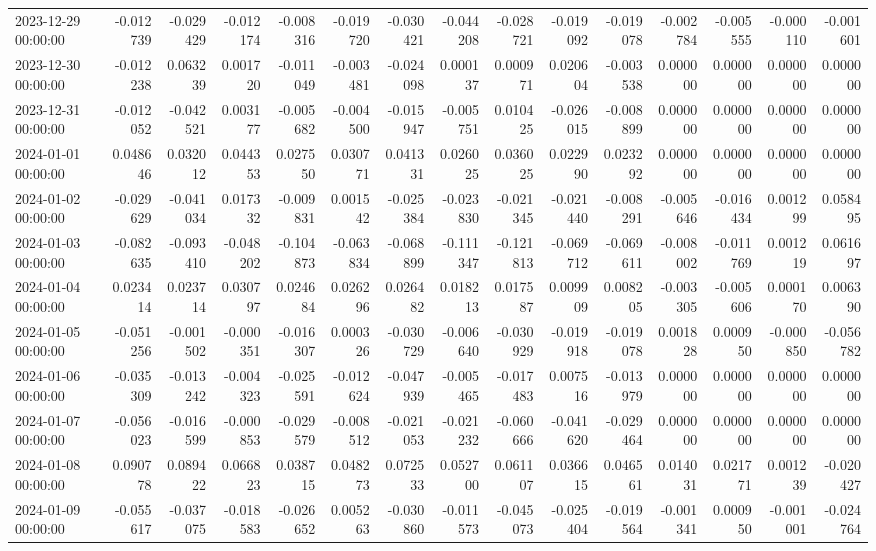 \begin{tabular}{lrrrrrrrrrrrrrr}
2023-12-29 00:00:00 & -0.012739 & -0.029429 & -0.012174 & -0.008316 & -0.019720 & -0.030421 & -0.044208 & -0.028721 & -0.019092 & -0.019078 & -0.002784 & -0.005555 & -0.000110 & -0.001601 \\
2023-12-30 00:00:00 & -0.012238 & 0.063239 & 0.001720 & -0.011049 & -0.003481 & -0.024098 & 0.000137 & 0.000971 & 0.020604 & -0.003538 & 0.000000 & 0.000000 & 0.000000 & 0.000000 \\
2023-12-31 00:00:00 & -0.012052 & -0.042521 & 0.003177 & -0.005682 & -0.004500 & -0.015947 & -0.005751 & 0.010425 & -0.026015 & -0.008899 & 0.000000 & 0.000000 & 0.000000 & 0.000000 \\
2024-01-01 00:00:00 & 0.048646 & 0.032012 & 0.044353 & 0.027550 & 0.030771 & 0.041331 & 0.026025 & 0.036025 & 0.022990 & 0.023292 & 0.000000 & 0.000000 & 0.000000 & 0.000000 \\
2024-01-02 00:00:00 & -0.029629 & -0.041034 & 0.017332 & -0.009831 & 0.001542 & -0.025384 & -0.023830 & -0.021345 & -0.021440 & -0.008291 & -0.005646 & -0.016434 & 0.001299 & 0.058495 \\
2024-01-03 00:00:00 & -0.082635 & -0.093410 & -0.048202 & -0.104873 & -0.063834 & -0.068899 & -0.111347 & -0.121813 & -0.069712 & -0.069611 & -0.008002 & -0.011769 & 0.001219 & 0.061697 \\
2024-01-04 00:00:00 & 0.023414 & 0.023714 & 0.030797 & 0.024684 & 0.026296 & 0.026482 & 0.018213 & 0.017587 & 0.009909 & 0.008205 & -0.003305 & -0.005606 & 0.000170 & 0.006390 \\
2024-01-05 00:00:00 & -0.051256 & -0.001502 & -0.000351 & -0.016307 & 0.000326 & -0.030729 & -0.006640 & -0.030929 & -0.019918 & -0.019078 & 0.001828 & 0.000950 & -0.000850 & -0.056782 \\
2024-01-06 00:00:00 & -0.035309 & -0.013242 & -0.004323 & -0.025591 & -0.012624 & -0.047939 & -0.005465 & -0.017483 & 0.007516 & -0.013979 & 0.000000 & 0.000000 & 0.000000 & 0.000000 \\
2024-01-07 00:00:00 & -0.056023 & -0.016599 & -0.000853 & -0.029579 & -0.008512 & -0.021053 & -0.021232 & -0.060666 & -0.041620 & -0.029464 & 0.000000 & 0.000000 & 0.000000 & 0.000000 \\
2024-01-08 00:00:00 & 0.090778 & 0.089422 & 0.066823 & 0.038715 & 0.048273 & 0.072533 & 0.052700 & 0.061107 & 0.036615 & 0.046561 & 0.014031 & 0.021771 & 0.001239 & -0.020427 \\
2024-01-09 00:00:00 & -0.055617 & -0.037075 & -0.018583 & -0.026652 & 0.005263 & -0.030860 & -0.011573 & -0.045073 & -0.025404 & -0.019564 & -0.001341 & 0.000950 & -0.001001 & -0.024764 \\

\end{tabular}
